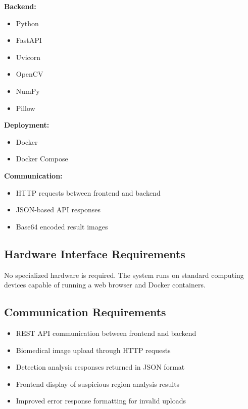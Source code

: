 \documentclass[12pt]{article}
\begin{document}
\textbf{Backend:}

\begin{itemize}
    \item Python
    \item FastAPI
    \item Uvicorn
    \item OpenCV
    \item NumPy
    \item Pillow
\end{itemize}

\textbf{Deployment:}

\begin{itemize}
    \item Docker
    \item Docker Compose
\end{itemize}

\textbf{Communication:}

\begin{itemize}
    \item HTTP requests between frontend and backend
    \item JSON-based API responses
    \item Base64 encoded result images
\end{itemize}

\subsection{Hardware Interface Requirements}

No specialized hardware is required. The system runs on standard computing devices
capable of running a web browser and Docker containers.

\subsection{Communication Requirements}

\begin{itemize}
    \item REST API communication between frontend and backend
    \item Biomedical image upload through HTTP requests
    \item Detection analysis responses returned in JSON format
    \item Frontend display of suspicious region analysis results
    \item Improved error response formatting for invalid uploads
\end{itemize}
\end{document}
